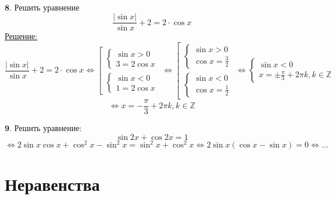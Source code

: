 \documentclass{article}
\begin{document}
\\
$\mathbf{8}$. Решить уравнение 
\[ \frac{|\sin x|}{\sin x} + 2 = 2\cdot \cos x\] 
\underline{Решение:}
\begin{equation*}
\frac{|\sin x|}{\sin x} + 2 = 2\cdot \cos x
\Leftrightarrow
    \left[
    \begin{gathered}
    \begin{cases}
    \sin x > 0
    \\
    3 = 2\cos x
    \end{cases}
    \\
    \begin{cases}
    \sin x < 0
    \\
    1 = 2\cos x
    \end{cases}
    \end{gathered}
    \right.
    \Leftrightarrow
    \left[
    \begin{gathered}
    \begin{cases}
    \sin x > 0
    \\
    \cos x = \frac{3}{2}
    \end{cases}
    \\
    \begin{cases}
    \sin x < 0
    \\
    \cos x = \frac{1}{2}
    \end{cases}
    \end{gathered}
    \right.
    \Leftrightarrow
    \begin{cases}
    \sin x < 0
    \\
    x = \pm \frac{\pi}{3} + 2 \pi k, k \in \mathbb{Z}
    \end{cases}
\end{equation*}
\[ \Leftrightarrow x = -\frac{\pi}{3} + 2 \pi k, k \in \mathbb{Z}\]

$\mathbf{9}$. Решить уравнение:
\[ \sin 2x + \cos 2x = 1 \]
\[ \Leftrightarrow 2\sin x \cos x + \cos^2 x - \sin^2 x = \sin^2 x + \cos^2 x 
\Leftrightarrow 2\sin x (\cos x - \sin x) = 0 \Leftrightarrow ...\]

\section{Неравенства}
\end{document}

